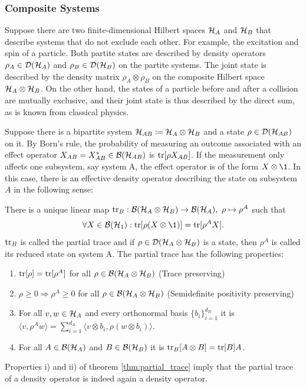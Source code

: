 \subsubsection{Composite Systems}
Suppose there are two finite-dimensional Hilbert spaces $\mathcal{H}_A$ and $\mathcal{H}_B$ that describe systems that do not exclude each other. For example, the excitation and spin of a particle. Both partite states are described by density operators $\rho_A \in \mathcal D(\mathcal{H}_A)$ and $\rho_B \in \mathcal D(\mathcal{H}_B)$ on the partite systems. The joint state is described by the density matrix $\rho_A \otimes \rho_B$ on the composite Hilbert space $\mathcal{H}_A\otimes \mathcal{H}_B$. On the other hand, the states of a particle before and after a collision are mutually exclusive, and their joint state is thus described by the direct sum, as is known from classical physics.

Suppose there is a bipartite system $\mathcal{H}_{AB}\coloneqq \mathcal{H}_A \otimes \mathcal{H}_B$ and a state $\rho \in \mathcal D(\mathcal{H}_{AB})$ on it. By Born's rule, the probability of measuring an outcome associated with an effect operator $X_{AB}=X_{AB}^* \in \mathcal B(\mathcal{H}_{AB})$ is $\mathrm{tr}[\rho X_{AB}]$. If the measurement only affects one subsystem, say system A, the effect operator is of the form $X \otimes \1$. In this case, there is an effective density operator describing the state on subsystem $A$ in the following sense:
\begin{theorem}\label{thm:partial_trace}
    There is a unique linear map $\mathrm{tr}_B: \mathcal B(\mathcal{H}_A \otimes \mathcal{H}_B) \rightarrow \mathcal B(\mathcal{H}_A), \ \rho \mapsto \rho^A$ such that
    \begin{align*}
        \forall X \in \m B(\hi_1): \tr[\rho(X \otimes \1)] = \tr[\rho^A X].
    \end{align*}
    $\mathrm{tr}_B$ is called the partial trace and if $\rho \in \mathcal D(\mathcal{H}_A \otimes \mathcal{H}_B)$ is a state, then $\rho^A$ is called its reduced state on system A. The partial trace has the following properties:
    \begin{enumerate}
        \item $\mathrm{tr}[\rho] = \mathrm{tr}[\rho^A]$ for all $\rho \in \mathcal B(\mathcal{H}_A \otimes \mathcal{H}_B)$ (Trace preserving)
        \item $\rho \geq 0  \Rightarrow \rho^A \geq 0$ for all $\rho \in \mathcal B(\mathcal{H}_A \otimes \mathcal{H}_B)$ (Semidefinite positivity preserving)
        \item For all $v,w \in \mathcal{H}_A$ and every orthonormal basis $\{b_i\}_{i=1}^{d_B}$ it is $\langle v, \rho^A w\rangle = \sum_{i=1}^{d_A} \langle v \otimes b_i, \rho(w \otimes b_i)\rangle$.
        \item For all $A \in \mathcal B(\mathcal{H}_A)$ and $B \in \mathcal B(\mathcal{H}_B)$ it is $\mathrm{tr}_B[A \otimes B] = \mathrm{tr}[B]A$. {}
    \end{enumerate}
\end{theorem}\noindent
Properties i) and ii) of theorem \ref{thm:partial_trace} imply that the partial trace of a density operator is indeed again a density operator. 


